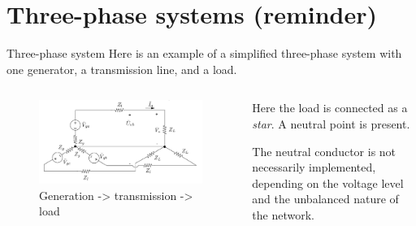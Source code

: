 \section{Three-phase systems (reminder)}
\begin{frame}{Three-phase system }
Here is an example of a simplified three-phase system with one generator, a transmission line, and a load.
\begin{columns}
    \begin{column}{0.55\textwidth}
    \begin{figure}
        \centering
        \includegraphics[width=\textwidth]{images/three-phase-system.png}
        \caption{Generation -> transmission -> load}
    \end{figure}
    \end{column}
    \begin{column}{0.35\textwidth}
    Here the load is connected as a \textit{star}. A neutral point is present. 
    
    The neutral conductor is not necessarily implemented, depending on the voltage level and the unbalanced nature of the network.
    \end{column}
\end{columns}
\end{frame}

